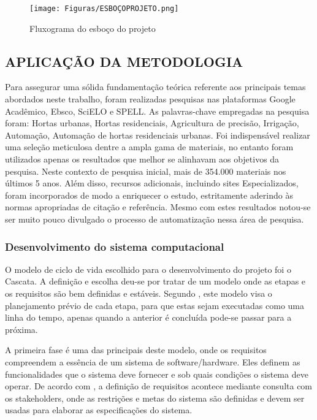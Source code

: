 \documentclass[%
  article,%
  a4paper,%
  12pt,%
  fleqn,%
  oneside,%
  chapter = TITLE,%
  section = TITLE,%
]{abntex2}
\begin{document}
\begin{figure}[!htb]
    \centering%
    \caption{Fluxograma do esboço do projeto}
    \texttt{[image: Figuras/ESBOÇOPROJETO.png]}
    \label{fig:escopo}
\end{figure}

\subsection{APLICAÇÃO DA METODOLOGIA}

Para assegurar uma sólida fundamentação teórica referente aos principais temas abordados neste trabalho, foram realizadas pesquisas nas plataformas Google Acadêmico, Ebsco, SciELO e SPELL. As palavras-chave empregadas na pesquisa foram: Hortas urbanas, Hortas residenciais,
Agricultura de precisão, Irrigação, Automação, Automação de hortas residenciais urbanas.
Foi indispensável realizar uma seleção meticulosa dentre a ampla gama de materiais, no entanto foram utilizados apenas os resultados que melhor se alinhavam aos objetivos da pesquisa. Neste contexto de pesquisa inicial, mais de 354.000 materiais nos últimos 5 anos. Além disso, recursos adicionais, incluindo sites Especializados, foram incorporados de modo a enriquecer o estudo, estritamente aderindo às normas apropriadas de citação e referência. Mesmo com estes resultados notou-se ser muito pouco divulgado o processo de automatização nessa área de pesquisa.

\subsubsection{Desenvolvimento do sistema computacional}\label{sec:devSis}

O modelo de ciclo de vida escolhido para o desenvolvimento do projeto foi o Cascata. A definição e escolha deu-se por tratar de um modelo onde as etapas e os requisitos são bem definidas e estáveis. Segundo \citet{Stankiewicz2017}, este modelo visa o planejamento prévio de cada etapa, para que estas sejam executadas como uma linha do tempo, apenas quando a anterior é concluída pode-se passar para a próxima.

 A primeira fase é uma das principais deste modelo, onde os requisitos  compreendem a essência de um sistema de software/hardware. Eles definem as funcionalidades que o sistema deve fornecer e sob quais condições o sistema deve operar. De acordo com \citet{Sommerville2011}, a definição de requisitos acontece mediante consulta com os stakeholders, onde as restrições e metas do sistema são definidas e devem ser usadas para elaborar as especificações do sistema. 
 
\end{document}
